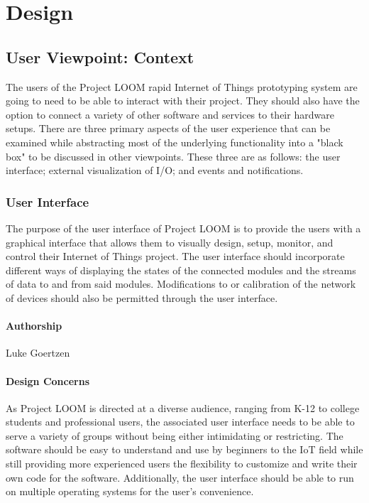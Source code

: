 \documentclass[onecolumn, draftclsnofoot,10pt, compsoc]{IEEEtran}
\begin{document}
\section{Design}
\subsection{User Viewpoint: Context}
    The users of the Project LOOM rapid Internet of Things prototyping system are going to need to be able to interact with their project. They should also have the option to connect a variety of other software and services to their hardware setups. There are three primary aspects of the user experience that can be examined while abstracting most of the underlying functionality into a "black box" to be discussed in other viewpoints. These three are as follows: the user interface; external visualization of I/O; and events and notifications.

\subsubsection{User Interface}
    The purpose of the user interface of Project LOOM is to provide the users with a graphical interface that allows them to visually design, setup, monitor, and control their Internet of Things project. The user interface should incorporate different ways of displaying the states of the connected modules and the streams of data to and from said modules. Modifications to or calibration of the network of devices should also be permitted through the user interface.

\paragraph{Authorship}
    Luke Goertzen

\paragraph{Design Concerns}
    As Project LOOM is directed at a diverse audience, ranging from K-12 to college students and professional users, the associated user interface needs to be able to serve a variety of groups without being either intimidating or restricting. The software should be easy to understand and use by beginners to the IoT field while still providing more experienced users the flexibility to customize and write their own code for the software. Additionally, the user interface should be able to run on multiple operating systems for the user's convenience.
\end{document}
